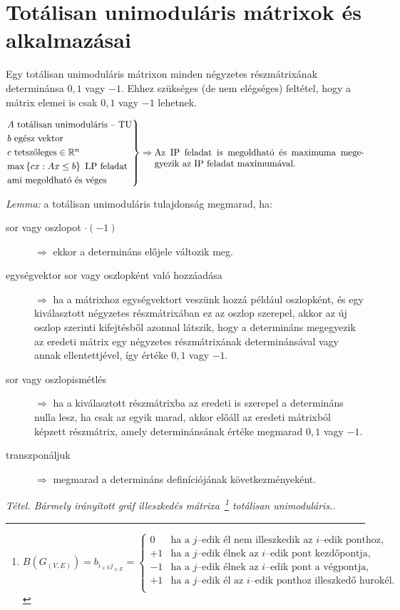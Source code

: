 ﻿\newpage
\section{Totálisan unimoduláris mátrixok és alkalmazásai}

Egy totálisan unimoduláris mátrixon minden négyzetes részmátrixának determinánsa
$0, 1$ vagy $-1$. Ehhez szükséges (de nem elégséges) feltétel, hogy a mátrix
elemei is csak $0, 1$ vagy $-1$ lehetnek.

\[
\begin{rcases}
A \text{ totálisan unimoduláris -- TU} \\
b \text{ egész vektor} \\
c \text{ tetszőleges} \in \mathbb{R}^n \\
\text{max} \left\{ cx:Ax \leq b \right\} \text{ LP feladat}\\
\text{ami megoldható és véges}
\end{rcases} \Rightarrow \parbox[t]{8cm}{ Az IP feladat is megoldható és
maximuma megegyezik az IP feladat maximumával.}
\]

\emph{Lemma:} a totálisan unimoduláris tulajdonság megmarad, ha:

\begin{description}
  \item[sor vagy oszlopot $\cdot (-1)$] $\Rightarrow$ ekkor a determináns
  előjele változik meg.
  \item[egységvektor sor vagy oszlopként való hozzáadása] $\Rightarrow$ ha a
  mátrixhoz egységvektort veszünk hozzá például oszlopként, és egy kiválasztott
  négyzetes részmátrixában ez az oszlop szerepel, akkor az új oszlop szerinti
  kifejtésből azonnal látszik, hogy a determináns megegyezik az eredeti mátrix
  egy négyzetes részmátrixának determinánsával vagy annak ellentettjével, így
  értéke $0, 1$ vagy $-1$.
  \item[sor vagy oszlopismétlés] $\Rightarrow$ ha a kiválasztott részmátrixba
  az eredeti is szerepel a determináns nulla lesz, ha csak az egyik marad, akkor
  előáll az eredeti mátrixból képzett részmátrix, amely determinánsának értéke
  megmarad $0, 1$ vagy $-1$. 
  \item[transzponáljuk] $\Rightarrow$ megmarad a determináns definíciójának
  következményeként.
\end{description}

\emph{Tétel. Bármely irányított gráf illeszkedés mátrixa~\footnote{$ 
B(G_{(V,E)})=
b_{i_{\in V}j_{\in E}}=
\begin{cases}
0  & \text{ha a } j \text{--edik él nem illeszkedik az } i \text{--edik ponthoz,} \\
+1  & \text{ha a } j \text{--edik élnek az } i \text{--edik pont kezdőpontja,} \\
-1  & \text{ha a } j \text{--edik élnek az } i \text{--edik pont a végpontja,} \\
+1  & \text{ha a } j \text{--edik él az } i \text{--edik ponthoz illeszkedő hurokél.} \\
\end{cases}$} totálisan unimoduláris.}.\\

